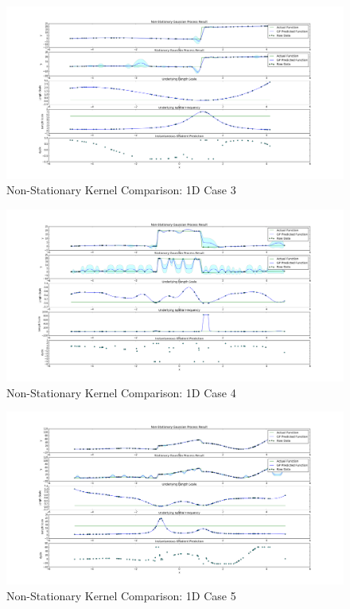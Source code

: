				\begin{figure}[!htbp]
					\centering
						\includegraphics[width=\textwidth]{Figures/Progress/figure_1Dcase3.png}
					\caption{Non-Stationary Kernel Comparison: 1D Case 3}
					\label{ProgressReport:GaussianProcessModels:Figure:figure_1Dcase3}
				\end{figure}
				
				\begin{figure}[!htbp]
					\centering
						\includegraphics[width=\textwidth]{Figures/Progress/figure_1Dcase4.png}
					\caption{Non-Stationary Kernel Comparison: 1D Case 4}
					\label{ProgressReport:GaussianProcessModels:Figure:figure_1Dcase4}
				\end{figure}
				
				\begin{figure}[!htbp]
					\centering
						\includegraphics[width=\textwidth]{Figures/Progress/figure_1Dcase5.png}
					\caption{Non-Stationary Kernel Comparison: 1D Case 5}
					\label{ProgressReport:GaussianProcessModels:Figure:figure_1Dcase5}
				\end{figure}
								
